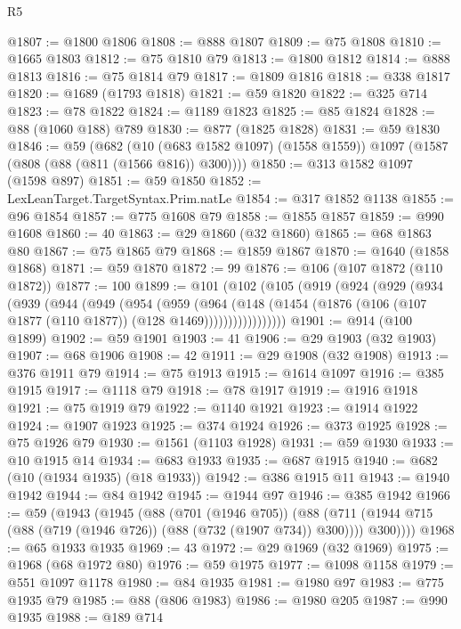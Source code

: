 \begin{lexlean}{R5}
\begin{coremodule}
@1807 := @1800 @1806
@1808 := @888 @1807
@1809 := @75 @1808
@1810 := @1665 @1803
@1812 := @75 @1810 @79
@1813 := @1800 @1812
@1814 := @888 @1813
@1816 := @75 @1814 @79
@1817 := @1809 @1816
@1818 := @338 @1817
@1820 := @1689 (@1793 @1818)
@1821 := @59 @1820
@1822 := @325 @714
@1823 := @78 @1822
@1824 := @1189 @1823
@1825 := @85 @1824
@1828 := @88 (@1060 @188) @789
@1830 := @877 (@1825 @1828)
@1831 := @59 @1830
@1846 := @59
    (@682
      (@10 (@683 @1582 @1097) (@1558 @1559))
      @1097
      (@1587 (@808 (@88 (@811 (@1566 @816)) @300))))
@1850 := @313 @1582 @1097 (@1598 @897)
@1851 := @59 @1850
@1852 := LexLeanTarget.TargetSyntax.Prim.natLe
@1854 := @317 @1852 @1138
@1855 := @96 @1854
@1857 := @775 @1608 @79
@1858 := @1855 @1857
@1859 := @990 @1608
@1860 := 40
@1863 := @29 @1860 (@32 @1860)
@1865 := @68 @1863 @80
@1867 := @75 @1865 @79
@1868 := @1859 @1867
@1870 := @1640 (@1858 @1868)
@1871 := @59 @1870
@1872 := 99
@1876 := @106 (@107 @1872 (@110 @1872))
@1877 := 100
@1899 := @101
    (@102
      (@105
        (@919
          (@924
            (@929
              (@934
                (@939
                  (@944
                    (@949
                      (@954
                        (@959
                          (@964
                            (@148
                              (@1454
                                (@1876 (@106 (@107 @1877 (@110 @1877)) (@128 @1469)))))))))))))))))
@1901 := @914 (@100 @1899)
@1902 := @59 @1901
@1903 := 41
@1906 := @29 @1903 (@32 @1903)
@1907 := @68 @1906
@1908 := 42
@1911 := @29 @1908 (@32 @1908)
@1913 := @376 @1911 @79
@1914 := @75 @1913
@1915 := @1614 @1097
@1916 := @385 @1915
@1917 := @1118 @79
@1918 := @78 @1917
@1919 := @1916 @1918
@1921 := @75 @1919 @79
@1922 := @1140 @1921
@1923 := @1914 @1922
@1924 := @1907 @1923
@1925 := @374 @1924
@1926 := @373 @1925
@1928 := @75 @1926 @79
@1930 := @1561 (@1103 @1928)
@1931 := @59 @1930
@1933 := @10 @1915 @14
@1934 := @683 @1933
@1935 := @687 @1915
@1940 := @682 (@10 (@1934 @1935) (@18 @1933))
@1942 := @386 @1915 @11
@1943 := @1940 @1942
@1944 := @84 @1942
@1945 := @1944 @97
@1946 := @385 @1942
@1966 := @59
    (@1943
      (@1945
        (@88
          (@701 (@1946 @705))
          (@88 (@711 (@1944 @715 (@88 (@719 (@1946 @726)) (@88 (@732 (@1907 @734)) @300)))) @300))))
@1968 := @65 @1933 @1935
@1969 := 43
@1972 := @29 @1969 (@32 @1969)
@1975 := @1968 (@68 @1972 @80)
@1976 := @59 @1975
@1977 := @1098 @1158
@1979 := @551 @1097 @1178
@1980 := @84 @1935
@1981 := @1980 @97
@1983 := @775 @1935 @79
@1985 := @88 (@806 @1983)
@1986 := @1980 @205
@1987 := @990 @1935
@1988 := @189 @714

\end{coremodule}
\end{lexlean}
